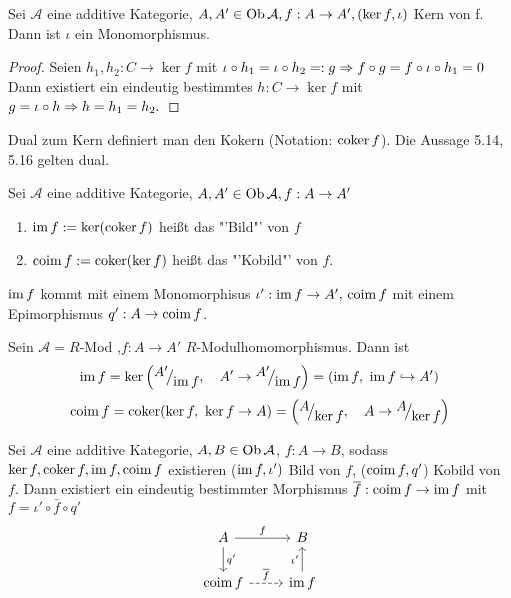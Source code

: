 \begin{bem}
	Sei $\mathcal{A} $ eine additive Kategorie, $ A,A' \in \text{Ob}\,\mathcal{A}, f: A  \to A' , (\ker f, \iota) $ Kern von f. Dann ist $\iota$ ein Monomorphismus. 
\end{bem}
\begin{proof}
	Seien $ h_1,h_2: C \to \ker f $ mit $ \iota\circ h_1 = \iota \circ h_2 =:g \Rightarrow f \circ g = f \circ \iota \circ h_1 = 0 $ Dann existiert ein eindeutig bestimmtes $h: C \to \ker f $ mit $ g = \iota\circ h \Rightarrow h = h_1 = h_2. $
\end{proof}
\begin{bem+df}
	Dual zum Kern definiert man den Kokern (Notation: $ \operatorname{coker} f$). Die Aussage 5.14, 5.16 gelten dual.
\end{bem+df}
\begin{df}
	 Sei $\mathcal{A} $ eine additive Kategorie, $ A,A' \in \text{Ob}\,\mathcal{A}, f: A \to A'$ 
	 \begin{enumerate}
	 \item[] $\operatorname{im} f := \ker(\operatorname{coker} f) $ heißt das "'Bild"' von $f$ 
	 \item[] $\operatorname{coim} f := \operatorname{coker}(\ker f) $ heißt das "'Kobild"' von $f$.
	\end{enumerate}
\end{df}
\begin{anm}
	$\operatorname{im} f $ kommt mit einem Monomorphisus $\iota': \operatorname{im} f \to A' ,\, \operatorname{coim} f $ mit einem Epimorphismus $ q': A \to \operatorname{coim} f $.
\end{anm}
\begin{bsp}
	Sein $\mathcal{A} = R $-Mod ,$ f: A  \to A' $ $R$-Modulhomomorphismus. Dann ist 
	$$\im f = \ker\left(\QR{A'}{\im f},\quad  A' \to \QR{A'}{\im f}\right) = (\im f, \ \im f \hookrightarrow A')$$
	$$\coim f= \coker(\ker f, \ \ker f \to A) = \left(\QR{A}{\ker f},\quad  A \to \QR{A}{\ker f}\right)$$
\end{bsp}
\begin{bem}
	Sei $\mathcal{A}$ eine additive Kategorie, $A,B\in \text{Ob}\,\mathcal{A}$, $f:A\to B$, sodass $\ker f, \operatorname{coker} f, \operatorname{im} f, \operatorname{coim} f$ existieren ($\operatorname{im} f, \iota')$ Bild von $f$, ($\operatorname{coim} f, q'$) Kobild von $f$. Dann existiert ein eindeutig bestimmter Morphismus $\overline f: \operatorname{coim} f \to \operatorname{im} f$ mit $f= \iota' \circ \bar f \circ q'$
	$$\begin{tikzcd}
	A \arrow{r}{f} \arrow{d}{q'} & B \\
	\coim f \arrow[dashed]{r}{\bar f} & \im f \arrow{u}{\iota'}
	\end{tikzcd}$$
\end{bem}
